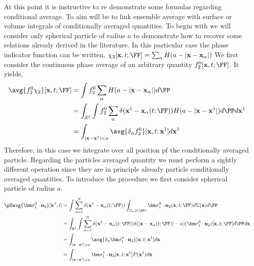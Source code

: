 At this point it is instructive to re demonstrate some formulas regarding conditional average. 
To aim will be to link ensemble average with surface or volume integrals of conditionally averaged quantities. 
To begin with we will consider only spherical particle of radius $a$ to demonstrate how to recover some relations already derived in the literature. 
In this particular case the phase indicator function can be written, $\chi_2[\textbf{x},t;\FF] = \sum_\alpha H(a - |\textbf{x} - \textbf{x}_\alpha|)$
We first consider the continuous phase average of an arbitrary quantity $f_2^0[\textbf{x},t;\FF]$. 
It yields, 
\begin{align}
    \avg{f_2^0 \chi_2}[\textbf{x},t;\FF]
    &= \int f_2^0 \sum_\alpha  H(a - |\textbf{x} - \textbf{x}_\alpha|) d\PP\\
    &= \int _{\mathbb{R}^3} \int f_2^0 \sum_\alpha  \delta(\textbf{x}^1 - \textbf{x}_\alpha(t;\FF)) H(a - |\textbf{x} - \textbf{x}^1|) d\PP d\textbf{x}^1\\
    &= \int _{|\textbf{x} - \textbf{x}^1| < a} \avg{ \delta_\alpha f_2^0}[\textbf{x},t;\textbf{x}^1] d\textbf{x}^1
\end{align} 
Therefore, in this case we integrate over all position pf the conditionally averaged particle. 
Regarding the particles averaged quantity we must perform a sightly different operation since they are in principle already particle conditionally averaged quantities.
To introduce the procedure we first consider spherical particle of radius $a$. 
\begin{align}
    \pSavg{\bm\sigma_1^0\cdot\textbf{n}_2}[\textbf{x}^1,t]
    &= \int \sum_{\alpha=1}^N \delta(\textbf{x}^1-\textbf{x}_\alpha(t; \FF))
    \int_{\Sigma_\alpha(t; \FF)}
    \bm\sigma_1^0\cdot\textbf{n}_2(\textbf{x},t;\FF)
    d\Sigma(\textbf{x}) d\PP\\
    &= 
    \int_{\mathbb{R}^3}
    \int
     \sum_{\alpha=1}^N \delta(\textbf{x}^1-\textbf{x}_\alpha(t; \FF))
    \delta(|\textbf{x} - \textbf{x}_{\alpha}(t;\FF)|-a)
    (\bm\sigma_1^0\cdot\textbf{n}_2)[\textbf{x},t;\FF]
    d\PP
    d\textbf{x}\\
    &=
    \int_{|\textbf{x}-\textbf{x}^1|=a}
    \avg{\delta_\alpha  \bm\sigma_1^0\cdot \textbf{n}_2}
    [\textbf{x},t;\textbf{x}^1]
    d\textbf{x}\\
    &=
    \int_{|\textbf{x}-\textbf{x}^1|=a}
    \bm\sigma_1^1\cdot \textbf{n}_2
    [\textbf{x},t;\textbf{x}^1]
    P(\textbf{x}^1)
    d\textbf{x}
    \label{eq:conditional_sphere}
\end{align}
